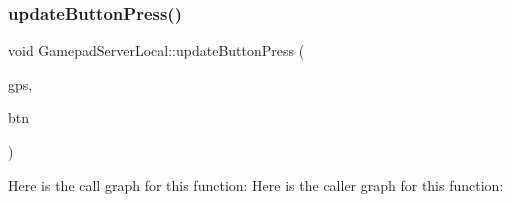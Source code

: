 \subsubsection{\texorpdfstring{update\+Button\+Press()}{updateButtonPress()}}
{\footnotesize\ttfamily void Gamepad\+Server\+Local\+::update\+Button\+Press (\begin{DoxyParamCaption}\item[{\mbox{\hyperlink{class_gamepad_state}{Gamepad\+State}} \&}]{gps,  }\item[{const uint32\+\_\+t \&}]{btn }\end{DoxyParamCaption})}

Here is the call graph for this function\+:
Here is the caller graph for this function\+:
